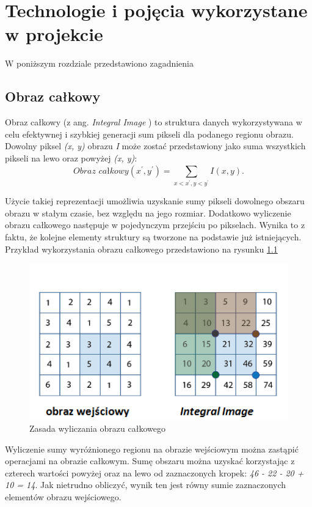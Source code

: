 \chapter{Technologie i pojęcia wykorzystane w projekcie  }
\label{cha:Technologie}
W poniższym rozdziale przedstawiono zagadnienia 

\section{Obraz całkowy}
Obraz całkowy (z ang. \textit{Integral Image} \cite{ViolaJonesIntegralImage}) to struktura danych wykorzystywana w celu efektywnej i szybkiej generacji sum pikseli dla podanego regionu obrazu. Dowolny piksel \textit{(x, y)} obrazu \textit{I} może zostać przedstawiony jako suma wszystkich pikseli na lewo oraz powyżej \textit{(x, y)}:
\begin{equation}
\textit{Obraz całkowy}(x^{'},y^{'}) = \sum_{x<x^{'},y<y^{'}}^{}I(x,y).
\end{equation}

Użycie takiej reprezentacji umożliwia uzyskanie sumy pikseli dowolnego obszaru obrazu w stałym czasie, bez względu na jego rozmiar. Dodatkowo wyliczenie obrazu całkowego następuje w pojedynczym przejściu po pikselach. Wynika to z faktu, że kolejne elementy struktury są tworzone na podstawie już istniejących. Przykład wykorzystania obrazu całkowego  przedstawiono na rysunku \ref{im: Integral Image} 

\begin{figure}[h]
	\includegraphics[width=12cm]{integral_image}
	\centering
	\caption{Zasada wyliczania obrazu całkowego}
	\label{im: Integral Image}
\end{figure}    

Wyliczenie sumy wyróżnionego regionu na obrazie wejściowym można zastąpić operacjami na obrazie całkowym. Sumę obszaru można uzyskać korzystając z czterech wartości powyżej oraz na lewo od zaznaczonych kropek: \textit{46 - 22 - 20 + 10 = 14}. Jak nietrudno obliczyć, wynik ten jest równy sumie zaznaczonych elementów obrazu wejściowego.

